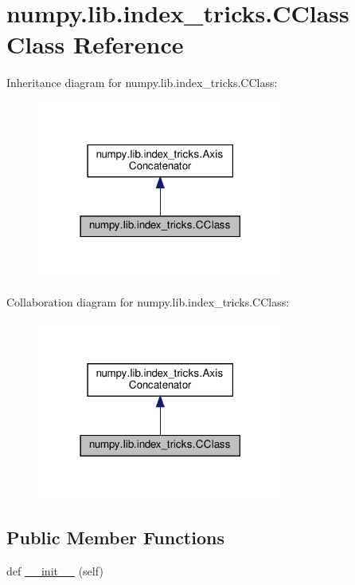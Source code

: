 \hypertarget{classnumpy_1_1lib_1_1index__tricks_1_1CClass}{}\section{numpy.\+lib.\+index\+\_\+tricks.\+C\+Class Class Reference}
\label{classnumpy_1_1lib_1_1index__tricks_1_1CClass}


Inheritance diagram for numpy.\+lib.\+index\+\_\+tricks.\+C\+Class\+:
\nopagebreak
\begin{figure}[H]
\begin{center}
\leavevmode
\includegraphics[width=230pt]{classnumpy_1_1lib_1_1index__tricks_1_1CClass__inherit__graph}
\end{center}
\end{figure}


Collaboration diagram for numpy.\+lib.\+index\+\_\+tricks.\+C\+Class\+:
\nopagebreak
\begin{figure}[H]
\begin{center}
\leavevmode
\includegraphics[width=230pt]{classnumpy_1_1lib_1_1index__tricks_1_1CClass__coll__graph}
\end{center}
\end{figure}
\subsection*{Public Member Functions}
\begin{DoxyCompactItemize}
\item 
def \hyperlink{classnumpy_1_1lib_1_1index__tricks_1_1CClass_af1423169c5c092c69d5a6a65275dbebe}{\+\_\+\+\_\+init\+\_\+\+\_\+} (self)
\end{DoxyCompactItemize}
